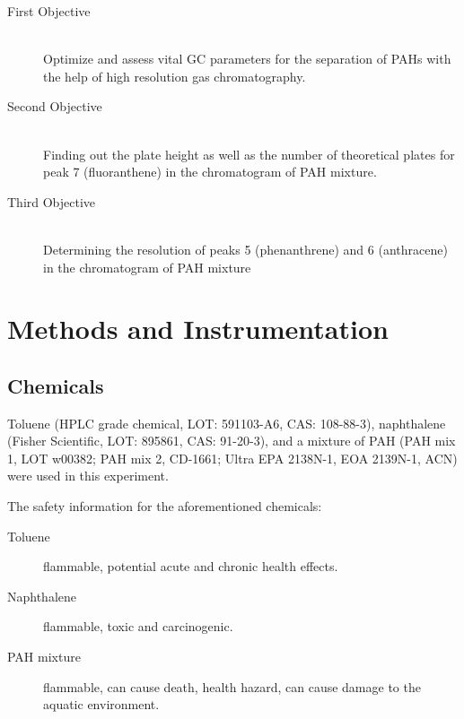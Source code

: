 \documentclass[a4paper, 12pt]{article}
\begin{document}
\begin{description}
	\item[First Objective] \hfill \\
		Optimize and assess vital GC parameters for the separation of PAHs with the help of high resolution gas chromatography.
	\item[Second Objective] \hfill \\
		Finding out the plate height as well as the number of theoretical plates for peak \num{7} (fluoranthene) in the chromatogram of PAH mixture.
	\item[Third Objective] \hfill \\
		Determining the resolution of peaks \num{5} (phenanthrene) and \num{6} (anthracene) in the chromatogram of PAH mixture
\end{description}
 

\section{Methods and Instrumentation}

\subsection{Chemicals}
Toluene (HPLC grade chemical, LOT: 591103-A6, CAS: 108-88-3), naphthalene (Fisher Scientific, LOT: 895861, CAS: 91-20-3), and a mixture of PAH (PAH mix 1, LOT w00382; PAH mix 2, CD-1661; Ultra EPA 2138N-1, EOA 2139N-1, ACN) were used in this experiment.

The safety information for the aforementioned chemicals:
\begin{description}
	\item[Toluene] flammable, potential acute and chronic health effects.
	\item[Naphthalene] flammable, toxic and carcinogenic.
	\item[PAH mixture] flammable, can cause death, health hazard, can cause damage to the aquatic environment.
\end{description}
\end{document}

